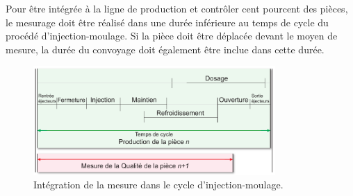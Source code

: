 %
%

Pour être intégrée à la ligne de production et contrôler cent pourcent des pièces, le mesurage doit être réalisé dans une durée inférieure au temps de cycle du procédé d'injection-moulage.
Si la pièce doit être déplacée devant le moyen de mesure, la durée du convoyage doit également être inclue dans cette durée.

\begin{figure}[tbhp]
	\centering
	\includegraphics[width=0.82\textwidth,height=\textheight,keepaspectratio]{../Chap1/Figures/SAPRISTI_Chronogramme-Simple.pdf}
	\caption{Intégration de la mesure dans le cycle d'injection-moulage.}
	\label{fig:time_constraint}
\end{figure}

